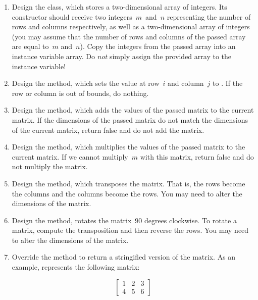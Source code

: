 \newpage %

\begin{enumerate}[label=(\alph*)]
    \item Design the  class, which stores a two-dimensional array of integers. Its constructor should receive two integers~$m$~and~$n$ representing the number of rows and columns respectively, as well as a two-dimensional array of integers (you may assume that the number of rows and columns of the passed array are equal to~$m$ and~$n$). Copy the integers from the passed array into an instance variable array. Do \emph{not} simply assign the provided array to the instance variable!
    \item Design the  method, which sets the value at row~$i$ and column~$j$ to . If the row or column is out of bounds, do nothing.
    \item Design the  method, which adds the values of the passed matrix to the current matrix. If the dimensions of the passed matrix do not match the dimensions of the current matrix, return false and do not add the matrix.
    \item Design the  method, which multiplies the values of the passed matrix to the current matrix. If we cannot multiply~$m$ with this matrix, return false and do not multiply the matrix.
    \item Design the  method, which transposes the matrix. That is, the rows become the columns and the columns become the rows. You may need to alter the dimensions of the matrix.
    \item Design the  method, rotates the matrix~$90$ degrees clockwise. To rotate a matrix, compute the transposition and then reverse the rows. You may need to alter the dimensions of the matrix.
    \item Override the  method to return a stringified version of the matrix. As an example,  represents the following matrix:

    \[
    \begin{bmatrix}
      1&2&3\\
      4&5&6
    \end{bmatrix}
    \]
\end{enumerate}

